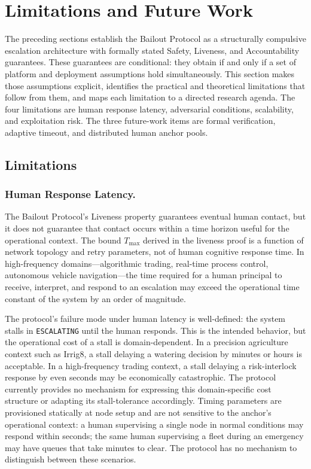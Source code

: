 \section{Limitations and Future Work}\label{sec:limitations}

The preceding sections establish the Bailout Protocol as a structurally compulsive escalation architecture with formally stated Safety, Liveness, and Accountability guarantees. These guarantees are conditional: they obtain if and only if a set of platform and deployment assumptions hold simultaneously. This section makes those assumptions explicit, identifies the practical and theoretical limitations that follow from them, and maps each limitation to a directed research agenda. The four limitations are human response latency, adversarial conditions, scalability, and exploitation risk. The three future-work items are formal verification, adaptive timeout, and distributed human anchor pools.

\subsection{Limitations}

\subsubsection{Human Response Latency.}
The Bailout Protocol's Liveness property guarantees eventual human contact, but it does not guarantee that contact occurs within a time horizon useful for the operational context. The bound $T_{\max}$ derived in the liveness proof is a function of network topology and retry parameters, not of human cognitive response time. In high-frequency domains---algorithmic trading, real-time process control, autonomous vehicle navigation---the time required for a human principal to receive, interpret, and respond to an escalation may exceed the operational time constant of the system by an order of magnitude.

The protocol's failure mode under human latency is well-defined: the system stalls in \texttt{ESCALATING} until the human responds. This is the intended behavior, but the operational cost of a stall is domain-dependent. In a precision agriculture context such as Irrig8, a stall delaying a watering decision by minutes or hours is acceptable. In a high-frequency trading context, a stall delaying a risk-interlock response by even seconds may be economically catastrophic. The protocol currently provides no mechanism for expressing this domain-specific cost structure or adapting its stall-tolerance accordingly. Timing parameters are provisioned statically at node setup and are not sensitive to the anchor's operational context: a human supervising a single node in normal conditions may respond within seconds; the same human supervising a fleet during an emergency may have queues that take minutes to clear. The protocol has no mechanism to distinguish between these scenarios.

